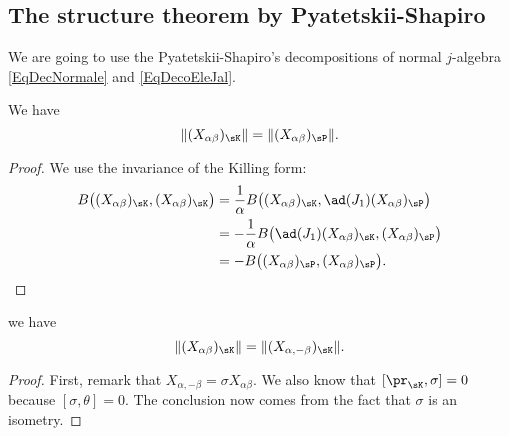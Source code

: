 	\subsection{The structure theorem by Pyatetskii-Shapiro}

	We are going to use the  Pyatetskii-Shapiro's decompositions of normal $j$-algebra \eqref{EqDecNormale} and \eqref{EqDecoEleJal}.

	\begin{lemma}
		We have
		\begin{equation}
			\| (X_{\alpha\beta})_{\sK} \|=\| (X_{\alpha\beta})_{\sP} \|.
		\end{equation}
	\end{lemma}

	\begin{proof}
		We use the invariance of the Killing form:
		\begin{equation}
			\begin{aligned}[]
				B\big( (X_{\alpha\beta})_{\sK},(X_{\alpha\beta})_{\sK} \big) & =\frac{1}{ \alpha }B\big( (X_{\alpha\beta})_{\sK},\ad(J_1)(X_{\alpha\beta})_{\sP} \big)  \\
				                                                             & =-\frac{1}{ \alpha }B\big( \ad(J_1)(X_{\alpha\beta})_{\sK},(X_{\alpha\beta})_{\sP} \big) \\
				                                                             & =-B\big( (X_{\alpha\beta})_{\sP},(X_{\alpha\beta})_{\sP} \big).
			\end{aligned}
		\end{equation}
	\end{proof}

	\begin{lemma}
		we have
		\begin{equation}
			\| (X_{\alpha\beta})_{\sK} \|=\| (X_{\alpha,-\beta})_{\sK} \|.
		\end{equation}
	\end{lemma}

	\begin{proof}
		First, remark that $X_{\alpha,-\beta}=\sigma X_{\alpha\beta}$. We also know that $[\pr_{\sK},\sigma]=0$ because $[\sigma,\theta]=0$. The conclusion now comes from the fact that $\sigma$ is an isometry.
	\end{proof}

